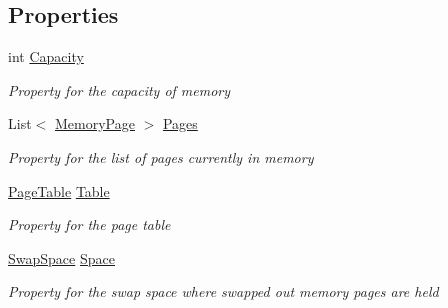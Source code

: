 \subsection*{Properties}
\begin{DoxyCompactItemize}
\item 
int \hyperlink{class_c_p_u___o_s___simulator_1_1_memory_1_1_physical_memory_af04d50462367295af1c8b4f9f1a75730}{Capacity}
\begin{DoxyCompactList}\small\item\em Property for the capacity of memory \end{DoxyCompactList}\item 
List$<$ \hyperlink{class_c_p_u___o_s___simulator_1_1_memory_1_1_memory_page}{Memory\+Page} $>$ \hyperlink{class_c_p_u___o_s___simulator_1_1_memory_1_1_physical_memory_ad099afa411ad366a734457fd824fea06}{Pages}
\begin{DoxyCompactList}\small\item\em Property for the list of pages currently in memory \end{DoxyCompactList}\item 
\hyperlink{class_c_p_u___o_s___simulator_1_1_memory_1_1_page_table}{Page\+Table} \hyperlink{class_c_p_u___o_s___simulator_1_1_memory_1_1_physical_memory_aaa669f8a92820bf792dd2ccb553254c9}{Table}
\begin{DoxyCompactList}\small\item\em Property for the page table \end{DoxyCompactList}\item 
\hyperlink{class_c_p_u___o_s___simulator_1_1_memory_1_1_swap_space}{Swap\+Space} \hyperlink{class_c_p_u___o_s___simulator_1_1_memory_1_1_physical_memory_a5d0fceb09f51edcfb4f483b5e8a9508a}{Space}
\begin{DoxyCompactList}\small\item\em Property for the swap space where swapped out memory pages are held \end{DoxyCompactList}\end{DoxyCompactItemize}
